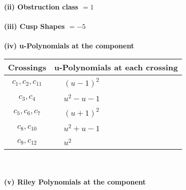 \documentclass[1p]{elsarticle_modified}
\theoremstyle{definition}
\begin{document}
\flushleft \textbf{(ii) Obstruction class $= 1$}\\~\\
\flushleft \textbf{(iii) Cusp Shapes $= -5$}\\~\\
\newpage\renewcommand{\arraystretch}{1}
\flushleft \textbf{(iv) u-Polynomials at the component}\newline \\
\begin{tabular}{m{50pt}|m{274pt}}
Crossings & \hspace{64pt}u-Polynomials at each crossing \\
\hline $$\begin{aligned}c_{1},c_{2},c_{11}\end{aligned}$$&$\begin{aligned}
&(u-1)^2
\end{aligned}$\\
\hline $$\begin{aligned}c_{3},c_{4}\end{aligned}$$&$\begin{aligned}
&u^2- u-1
\end{aligned}$\\
\hline $$\begin{aligned}c_{5},c_{6},c_{7}\end{aligned}$$&$\begin{aligned}
&(u+1)^2
\end{aligned}$\\
\hline $$\begin{aligned}c_{8},c_{10}\end{aligned}$$&$\begin{aligned}
&u^2+u-1
\end{aligned}$\\
\hline $$\begin{aligned}c_{9},c_{12}\end{aligned}$$&$\begin{aligned}
&u^2
\end{aligned}$\\
\hline
\end{tabular}\\~\\
\newpage\renewcommand{\arraystretch}{1}
\flushleft \textbf{(v) Riley Polynomials at the component}\newline \\
\end{document}

